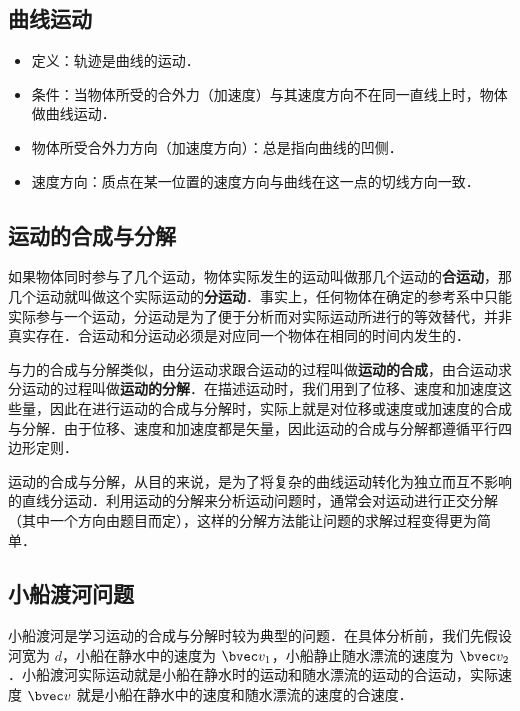 

\subsection{曲线运动}

\begin{itemize}
\item 定义：轨迹是曲线的运动．
\item 条件：当物体所受的合外力（加速度）与其速度方向不在同一直线上时，物体做曲线运动．
\item 物体所受合外力方向（加速度方向）：总是指向曲线的凹侧．
\item 速度方向：质点在某一位置的速度方向与曲线在这一点的切线方向一致．
\end{itemize}

\subsection{运动的合成与分解}

如果物体同时参与了几个运动，物体实际发生的运动叫做那几个运动的\textbf{合运动}，那几个运动就叫做这个实际运动的\textbf{分运动}．事实上，任何物体在确定的参考系中只能实际参与一个运动，分运动是为了便于分析而对实际运动所进行的等效替代，并非真实存在．合运动和分运动必须是对应同一个物体在相同的时间内发生的．

与力的合成与分解类似，由分运动求跟合运动的过程叫做\textbf{运动的合成}，由合运动求分运动的过程叫做\textbf{运动的分解}．在描述运动时，我们用到了位移、速度和加速度这些量，因此在进行运动的合成与分解时，实际上就是对位移或速度或加速度的合成与分解．由于位移、速度和加速度都是矢量，因此运动的合成与分解都遵循平行四边形定则．

运动的合成与分解，从目的来说，是为了将复杂的曲线运动转化为独立而互不影响的直线分运动．利用运动的分解来分析运动问题时，通常会对运动进行正交分解（其中一个方向由题目而定），这样的分解方法能让问题的求解过程变得更为简单．

\subsection{小船渡河问题}

小船渡河是学习运动的合成与分解时较为典型的问题．在具体分析前，我们先假设河宽为 $d$，小船在静水中的速度为 $\bvec v_1$，小船静止随水漂流的速度为 $\bvec v_2$．小船渡河实际运动就是小船在静水时的运动和随水漂流的运动的合运动，实际速度 $\bvec v$ 就是小船在静水中的速度和随水漂流的速度的合速度．

